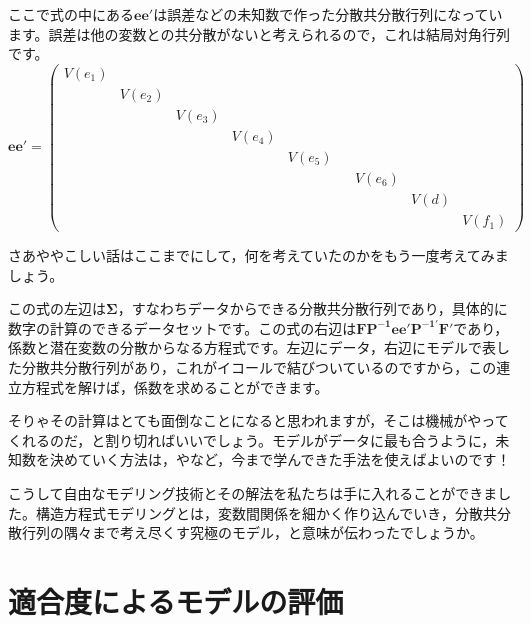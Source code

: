 \documentclass{ltjsbook}
\begin{document}
ここで式の中にある$\bm{ee'}$は誤差などの未知数で作った分散共分散行列になっています。誤差は他の変数との共分散がないと考えられるので，これは結局対角行列です。
\[
     \bm{ee'}= \begin{pmatrix}  V(e_1) & & & & & & & & \\
                                                                                      & V(e_2) & & & & & & & \\
                                                                                      &  & V(e_3)& & & & & & \\
                                                                                      &  & & V(e_4)& & & & & \\
                                                                                      & & & & V(e_5) & & & & \\
                                                                                      &  & & & & & V(e_6)& & \\
                                                                                      &  & & & & & & V(d)& \\
                                                                                      &  & & & & & & & V(f_1)\end{pmatrix} 
\]

さあややこしい話はここまでにして，何を考えていたのかをもう一度考えてみましょう。

この式の左辺は$\bm{\Sigma}$，すなわちデータからできる分散共分散行列であり，具体的に数字の計算のできるデータセットです。この式の右辺は$\bm{ FP^{-1} ee' P^{-1'} F' } $であり，係数と潜在変数の分散からなる方程式です。左辺にデータ，右辺にモデルで表した分散共分散行列があり，これがイコールで結びついているのですから，この連立方程式を解けば，係数を求めることができます。

そりゃその計算はとても面倒なことになると思われますが，そこは機械がやってくれるのだ，と割り切ればいいでしょう。モデルがデータに最も合うように，未知数を決めていく方法は，やなど，今まで学んできた手法を使えばよいのです！

こうして自由なモデリング技術とその解法を私たちは手に入れることができました。構造方程式モデリングとは，変数間関係を細かく作り込んでいき，分散共分散行列の隅々まで考え尽くす究極のモデル，と意味が伝わったでしょうか。

\section{適合度によるモデルの評価}
\end{document}
